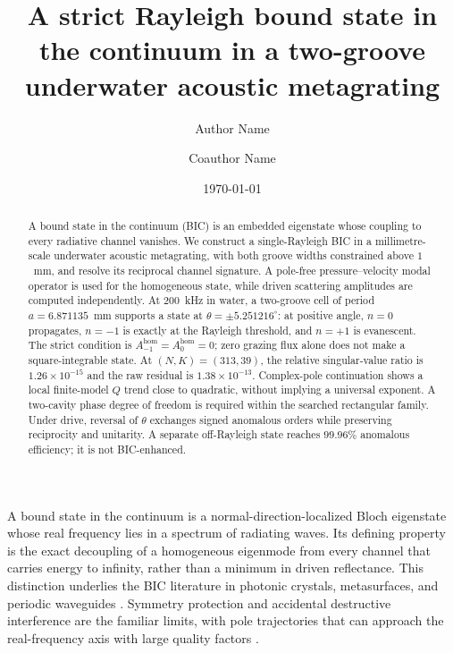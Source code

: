 \documentclass[aps,prl,reprint,superscriptaddress,nofootinbib]{revtex4-2}
\providecommand{\hom}{\mathrm{hom}}
\begin{document}
\title{A strict Rayleigh bound state in the continuum in a two-groove underwater acoustic metagrating}
\author{Author Name}
\author{Coauthor Name}
\date{\today}

\begin{abstract}
A bound state in the continuum (BIC) is an embedded eigenstate whose coupling to every radiative channel vanishes.  We construct a single-Rayleigh BIC in a millimetre-scale underwater acoustic metagrating, with both groove widths constrained above $1$~mm, and resolve its reciprocal channel signature.  A pole-free pressure--velocity modal operator is used for the homogeneous state, while driven scattering amplitudes are computed independently.  At $200$~kHz in water, a two-groove cell of period $a=6.871135$~mm supports a state at $\theta=\pm5.251216^{\circ}$: at positive angle, $n=0$ propagates, $n=-1$ is exactly at the Rayleigh threshold, and $n=+1$ is evanescent.  The strict condition is $A_{-1}^{\hom}=A_0^{\hom}=0$; zero grazing flux alone does not make a square-integrable state.  At $(N,K)=(313,39)$, the relative singular-value ratio is $1.26\times10^{-15}$ and the raw residual is $1.38\times10^{-13}$.  Complex-pole continuation shows a local finite-model $Q$ trend close to quadratic, without implying a universal exponent.  A two-cavity phase degree of freedom is required within the searched rectangular family.  Under drive, reversal of $\theta$ exchanges signed anomalous orders while preserving reciprocity and unitarity.  A separate off-Rayleigh state reaches $99.96\%$ anomalous efficiency; it is not BIC-enhanced.
\end{abstract}

\maketitle

A bound state in the continuum is a normal-direction-localized Bloch eigenstate whose real frequency lies in a spectrum of radiating waves.  Its defining property is the exact decoupling of a homogeneous eigenmode from every channel that carries energy to infinity, rather than a minimum in driven reflectance.  This distinction underlies the BIC literature in photonic crystals, metasurfaces, and periodic waveguides \cite{Hsu2016BIC,Koshelev2023Review,Azzam2021Review,Yang2014Analytical,Zhen2014Topological}.  Symmetry protection and accidental destructive interference are the familiar limits, with pole trajectories that can approach the real-frequency axis with large quality factors \cite{Hsu2013Observation,Sadrieva2017LeakyResonances,Abdrabou2022FrequencyPerturbation}.
\end{document}
